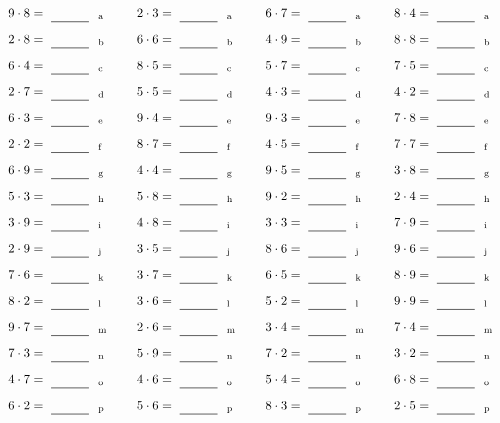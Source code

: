 \documentclass
[
  draft    = true,
  fontsize = 11pt,
  parskip  = half-
]
{scrartcl}
\begin{document}
\par\vfill\par
\begin{align*}
    \pline{9\cdot8}&=\rline{a}
  & \pline{2\cdot3}&=\rline{a}
  & \pline{6\cdot7}&=\rline{a}
  & \pline{8\cdot4}&=\rline{a} \\[1ex]
    \pline{2\cdot8}&=\rline{b}
  & \pline{6\cdot6}&=\rline{b}
  & \pline{4\cdot9}&=\rline{b}
  & \pline{8\cdot8}&=\rline{b} \\[1ex]
    \pline{6\cdot4}&=\rline{c}
  & \pline{8\cdot5}&=\rline{c}
  & \pline{5\cdot7}&=\rline{c}
  & \pline{7\cdot5}&=\rline{c} \\[1ex]
    \pline{2\cdot7}&=\rline{d}
  & \pline{5\cdot5}&=\rline{d}
  & \pline{4\cdot3}&=\rline{d}
  & \pline{4\cdot2}&=\rline{d} \\[1ex]
    \pline{6\cdot3}&=\rline{e}
  & \pline{9\cdot4}&=\rline{e}
  & \pline{9\cdot3}&=\rline{e}
  & \pline{7\cdot8}&=\rline{e} \\[1ex]
    \pline{2\cdot2}&=\rline{f}
  & \pline{8\cdot7}&=\rline{f}
  & \pline{4\cdot5}&=\rline{f}
  & \pline{7\cdot7}&=\rline{f} \\[1ex]
    \pline{6\cdot9}&=\rline{g}
  & \pline{4\cdot4}&=\rline{g}
  & \pline{9\cdot5}&=\rline{g}
  & \pline{3\cdot8}&=\rline{g} \\[1ex]
    \pline{5\cdot3}&=\rline{h}
  & \pline{5\cdot8}&=\rline{h}
  & \pline{9\cdot2}&=\rline{h}
  & \pline{2\cdot4}&=\rline{h} \\[1ex]
    \pline{3\cdot9}&=\rline{i}
  & \pline{4\cdot8}&=\rline{i}
  & \pline{3\cdot3}&=\rline{i}
  & \pline{7\cdot9}&=\rline{i} \\[1ex]
    \pline{2\cdot9}&=\rline{j}
  & \pline{3\cdot5}&=\rline{j}
  & \pline{8\cdot6}&=\rline{j}
  & \pline{9\cdot6}&=\rline{j} \\[1ex]
    \pline{7\cdot6}&=\rline{k}
  & \pline{3\cdot7}&=\rline{k}
  & \pline{6\cdot5}&=\rline{k}
  & \pline{8\cdot9}&=\rline{k} \\[1ex]
    \pline{8\cdot2}&=\rline{l}
  & \pline{3\cdot6}&=\rline{l}
  & \pline{5\cdot2}&=\rline{l}
  & \pline{9\cdot9}&=\rline{l} \\[1ex]
    \pline{9\cdot7}&=\rline{m}
  & \pline{2\cdot6}&=\rline{m}
  & \pline{3\cdot4}&=\rline{m}
  & \pline{7\cdot4}&=\rline{m} \\[1ex]
    \pline{7\cdot3}&=\rline{n}
  & \pline{5\cdot9}&=\rline{n}
  & \pline{7\cdot2}&=\rline{n}
  & \pline{3\cdot2}&=\rline{n} \\[1ex]
    \pline{4\cdot7}&=\rline{o}
  & \pline{4\cdot6}&=\rline{o}
  & \pline{5\cdot4}&=\rline{o}
  & \pline{6\cdot8}&=\rline{o} \\[1ex]
    \pline{6\cdot2}&=\rline{p}
  & \pline{5\cdot6}&=\rline{p}
  & \pline{8\cdot3}&=\rline{p}
  & \pline{2\cdot5}&=\rline{p}
\end{align*}
\end{document}
